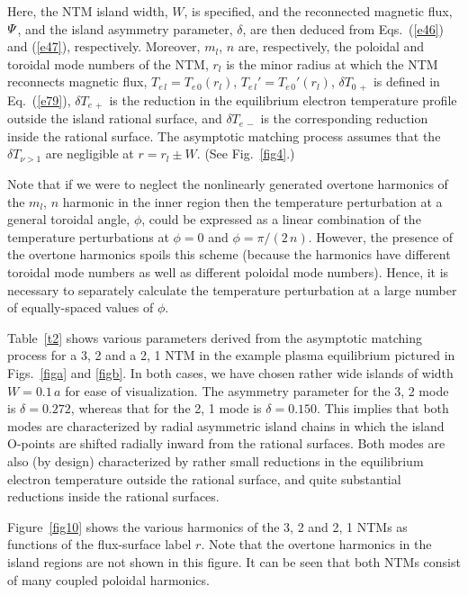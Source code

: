 \documentclass[12pt,prb,aps]{revtex4-1}
\begin{document}
Here, the NTM island width, $W$, is specified, and the reconnected magnetic flux, ${\mit\Psi}$, and the island asymmetry parameter, $\delta$,  are then deduced from Eqs.~(\ref{e46}) and (\ref{e47}), respectively. Moreover,
$m_l$, $n$ are, respectively, the poloidal and toroidal mode numbers of the NTM, $r_l$ is the minor radius at which the NTM reconnects magnetic
flux, $T_{e\,l}=T_{e\,0}(r_l)$, $T_{e\,l}' = T_{e\,0}'(r_l)$, $\delta T_{0\,+}$ is defined in Eq.~(\ref{e79}), $\delta T_{e\,+}$ is the reduction in the equilibrium electron temperature profile outside the
island rational surface, and $\delta T_{e\,-}$ is the corresponding reduction inside the rational surface. The asymptotic matching process assumes that
the $\delta T_{\nu>1}$ are negligible at $r= r_l\pm W$. (See Fig.~\ref{fig4}.)

 Note that if we were to neglect the nonlinearly generated overtone harmonics of the $m_l$, $n$ harmonic in the inner
region then the temperature perturbation at a general toroidal angle, $\phi$, could be expressed as  a linear combination of the temperature perturbations at $\phi=0$ and
$\phi=\pi/(2\,n)$. However, the presence of the overtone harmonics spoils this scheme (because the harmonics have different toroidal mode numbers as
well as different poloidal mode numbers). Hence, it is necessary to separately calculate the temperature perturbation at a large number of equally-spaced values of $\phi$. 

Table~\ref{t2} shows various parameters derived from the asymptotic matching process for a 3, 2 and a 2, 1 NTM in the example plasma equilibrium pictured in Figs.~\ref{figa} and
\ref{figb}. In both cases, we have chosen rather wide islands of width $W=0.1\,a$ for ease of visualization. The asymmetry parameter for the 3, 2 mode is $\delta=0.272$,
whereas that for the 2, 1 mode is $\delta=0.150$. This implies that both modes are characterized by radial asymmetric island chains in which the island O-points are
shifted radially inward from the rational surfaces. Both modes are also (by design) characterized by rather small reductions in the equilibrium electron temperature outside the
rational surface, and quite substantial reductions inside the rational surfaces.

 Figure~\ref{fig10} shows the various harmonics of the 3, 2 and 2, 1 NTMs as functions of the flux-surface
label $r$. Note that
the overtone harmonics in the island regions are not shown in this figure. It can be seen that both NTMs consist of many coupled poloidal harmonics. 
\end{document}
